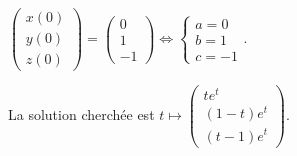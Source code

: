 {\begin{enumerate}
{\begin{center}
$\left(
\begin{array}{c}
x(0)\\
y(0)\\
z(0)
\end{array}
\right)=\left(
\begin{array}{c}
0\\
1\\
-1
\end{array}
\right)\Leftrightarrow\left\{
\begin{array}{l}
a=0\\
b=1\\
c=-1
\end{array}
\right.$.
\end{center}

La solution cherchée est $t\mapsto\left(
 \begin{array}{c}
 te^t\\
 (1-t)e^t\\
 (t-1)e^t
 \end{array}
 \right)$.}
\end{enumerate}
}
